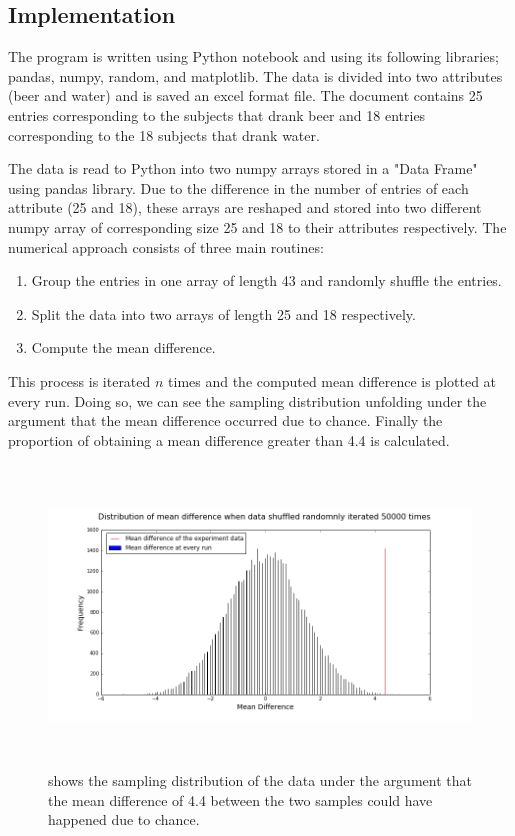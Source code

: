 \subsection{Implementation}
The program is written using Python notebook and using its following libraries; pandas, numpy, random, and matplotlib. The data is divided into two attributes (beer and water) and is saved an excel format file. The document contains 25 entries corresponding to the subjects that drank beer and 18  entries corresponding to the 18 subjects that drank water.

The data is read to Python into two numpy arrays stored in a "Data Frame" using pandas library. Due to the difference in the number of entries of each attribute (25 and 18), these arrays are reshaped and stored into two different numpy array of corresponding size 25 and 18 to their attributes respectively.
The numerical approach consists of three main routines:
\begin{enumerate}
  \item Group the entries in one array of length 43 and randomly shuffle the entries.
  \item Split the data into two arrays of length 25 and 18 respectively.
  \item Compute the mean difference.
\end{enumerate}
This process is iterated $n$ times and the computed mean difference is plotted at every run. Doing so, we can see the sampling distribution unfolding under the argument that the mean difference occurred due to chance. Finally the proportion of obtaining a mean difference greater than 4.4 is calculated.

\begin{figure}[t]
\centerline{\includegraphics[height=8cm,width=16cm]{./Figures/Distribution_50k}}
\caption{shows the sampling distribution of the data under the argument that the mean difference of 4.4 between the two samples could have happened due to chance. \label{histogram}}
\end{figure}

